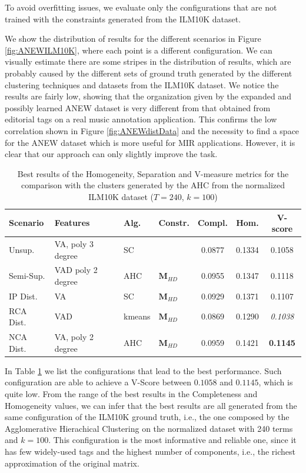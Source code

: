 To avoid overfitting issues, we evaluate only the configurations that are not trained with the constraints generated from the ILM10K dataset. 


We show the distribution of results for the different scenarios in Figure \ref{fig:ANEWILM10K}, where each point is a different configuration. We can visually estimate there are some stripes in the distribution of results, which are probably caused by the different sets of ground truth generated by the different clustering techniques and datasets from the ILM10K dataset. 
We notice the results are fairly low, showing that the organization given by the expanded and possibly learned ANEW dataset is very different from that obtained from editorial tags on a real music annotation application. This confirms the low correlation shown in Figure \ref{fig:ANEWdistData} and the necessity to find a space for the ANEW dataset which is more useful for MIR applications. However, it is clear that our approach can only slightly improve the task. 


\begin{table}[tbp]
    \small
\begin{center}
  \bgroup
  \def\arraystretch{1.5}
\begin{tabular}{ ||l  |l| l |l  |c|c|c ||}
\hline
\hline
Scenario 		& Features 		&  Alg. 	& Constr.  	& Compl. 	& Hom. 	& V-score \\
\hline
\hline
Unsup. 	& VA, poly 3 degree & SC &  &  0.0877 & 0.1334 & 0.1058 \\
\hline
Semi-Sup. & VAD poly 2 degree & AHC 		& $\mathbf{{M}}_{HD}$   & 0.0955 & 0.1347 & 0.1118 \\
\hline
IP Dist. & VA 			& SC 		& $\mathbf{{M}}_{HD}$   	& 0.0929 & 0.1371 & 0.1107 \\
\hline
RCA Dist. & VAD & kmeans & $\mathbf{{M}}_{HD}$ & 0.0869 & 0.1290 & {\color[HTML]{8E0000} \textit{0.1038}} \\
\hline
NCA Dist.& VA, poly 2 degree & AHC & $\mathbf{{M}}_{HD}$   & 0.0959 & 0.1421 & {\color[HTML]{326B00} \textbf{0.1145}}  \\
\hline
\hline
\end{tabular}
\egroup
\end{center}
\caption{Best results of the Homogeneity, Separation and V-measure metrics for the comparison with the clusters generated by the AHC from the normalized ILM10K dataset ($T=240$, $k=100$)}
\label{tab:ANEWv_score}
\end{table}

In Table \ref{tab:ANEWv_score} we list the configurations that lead to the best performance. Such configuration are able to achieve a V-Score between $0.1058$ and $0.1145$, which is quite low. From the range of the best results in the Completeness and Homogeneity values, we can infer that the best results are all generated from the same configuration of the ILM10K ground truth, i.e., the one composed by the Agglomerative Hierachical Clustering on the normalized dataset with 240 terms and $k=100$. This configuration is the most informative and reliable one, since it has few widely-used tags and the highest number of components, i.e., the richest approximation of the original matrix.  

